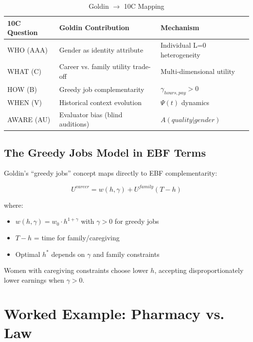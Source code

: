 \begin{table}[htbp]
\centering
\caption{Goldin $\rightarrow$ 10C Mapping}
\label{tab:goldin-9c}
\renewcommand{\arraystretch}{1.3}
\begin{tabular}{@{}lll@{}}
\toprule
\textbf{10C Question} & \textbf{Goldin Contribution} & \textbf{Mechanism} \\
\midrule
WHO (AAA) & Gender as identity attribute & Individual L=0 heterogeneity \\
WHAT (C) & Career vs. family utility trade-off & Multi-dimensional utility \\
HOW (B) & Greedy job complementarity & $\gamma_{hours,pay} > 0$ \\
WHEN (V) & Historical context evolution & $\Psi(t)$ dynamics \\
AWARE (AU) & Evaluator bias (blind auditions) & $A(quality|gender)$ \\
\bottomrule
\end{tabular}
\end{table}

\subsection{The Greedy Jobs Model in EBF Terms}

Goldin's ``greedy jobs'' concept maps directly to EBF complementarity:

\begin{equation}
U^{career} = w(h, \gamma) + U^{family}(T-h)
\end{equation}

where:
\begin{itemize}[nosep]
    \item $w(h, \gamma) = w_0 \cdot h^{1+\gamma}$ with $\gamma > 0$ for greedy jobs
    \item $T-h$ = time for family/caregiving
    \item Optimal $h^*$ depends on $\gamma$ and family constraints
\end{itemize}

Women with caregiving constraints choose lower $h$, accepting
disproportionately lower earnings when $\gamma > 0$.

\section{Worked Example: Pharmacy vs. Law}

